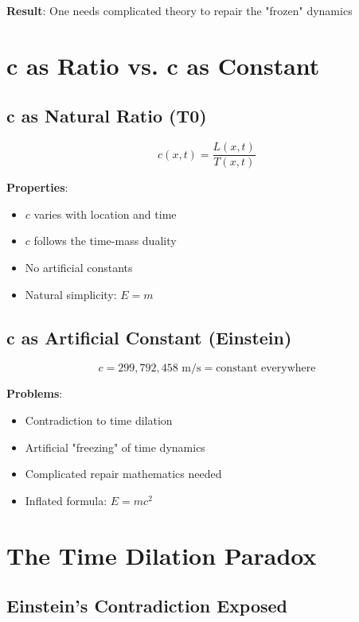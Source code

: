 \documentclass[12pt,a4paper]{article}
\begin{document}
	\textbf{Result}: One needs complicated theory to repair the "frozen" dynamics
	
	\section{c as Ratio vs. c as Constant}
	
	\subsection{c as Natural Ratio (T0)}
	
	\begin{equation}
		c(x,t) = \frac{L(x,t)}{T(x,t)}
	\end{equation}
	
	\textbf{Properties}:
	\begin{itemize}
		\item $c$ varies with location and time
		\item $c$ follows the time-mass duality
		\item No artificial constants
		\item Natural simplicity: $E = m$
	\end{itemize}
	
	\subsection{c as Artificial Constant (Einstein)}
	
	\begin{equation}
		c = 299,792,458 \text{ m/s} = \text{constant everywhere}
	\end{equation}
	
	\textbf{Problems}:
	\begin{itemize}
		\item Contradiction to time dilation
		\item Artificial "freezing" of time dynamics
		\item Complicated repair mathematics needed
		\item Inflated formula: $E = mc^2$
	\end{itemize}
	
	\section{The Time Dilation Paradox}
	
	\subsection{Einstein's Contradiction Exposed}
	
\end{document}

